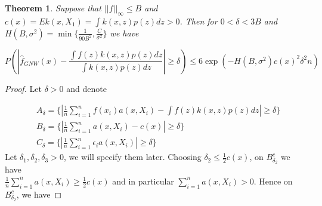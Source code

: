 \documentclass{article}
\newtheorem{theorem}{Theorem}[section]
\begin{document}
 
\begin{theorem}
\label{thm_1}
Suppose that $||f||_{\infty}\leq B$ and $c(x)=Ek(x,X_1)=\int k(x,z)p(z)dz>0$. Then
 for $0<\delta<3B$ and 
$H(B,\sigma^2)=\min\{\frac{1}{90B^2},\frac{C}{\sigma^2}\}$ we have

\begin{equation*}
    P(|\hat{f}_{GNW}(x)-\frac{\int f(z)k(x,z)p(z)dz}{\int k(x,z)p(z)dz}|\geq\delta)\leq 6\exp(-H(B,\sigma^2)c(x)^2\delta^2n)
\end{equation*}
\end{theorem}
\begin{proof} 
Let $\delta>0$ and denote

\begin{equation*}
\begin{split}
&A_{\delta}=\{|\frac{1}{n}\sum_{i=1}^n f(x_i)a(x,X_i)-\int f(z)k(x,z)p(z)dz|\geq \delta\}\\
&B_{\delta}=\{|\frac{1}{n}\sum_{i=1}^n a(x,X_i)-c(x)|\geq \delta\}\\
&C_{\delta}=\{|\frac{1}{n}\sum_{i=1}^n\epsilon_ia(x,X_i)|\geq \delta\}
\end{split}
\end{equation*}
Let $\delta_1, \delta_2,\delta_3>0$, we will  specify them later.
Choosing $\delta_2\leq\frac{1}{2}c(x)$, on $B_{\delta_2}^c$ we have
\\
$\frac{1}{n}\sum_{i=1}^na(x,X_i)\geq \frac{1}{2}c(x)$ and in particular $\sum_{i=1}^n a(x,X_i)>0$. Hence on $B_{\delta_2}^c$, we have 


\end{proof}
\end{document}
